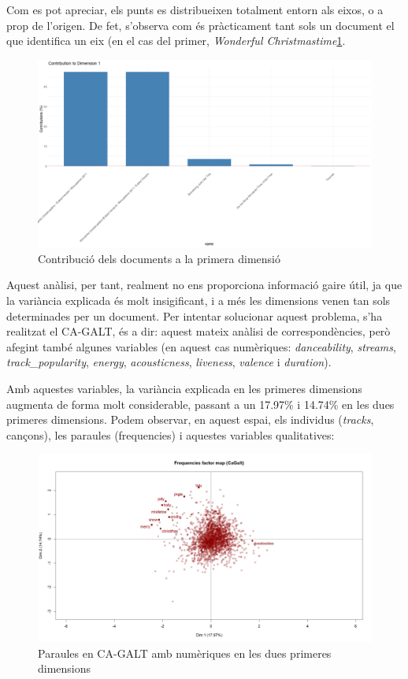 Com es pot apreciar, els punts es distribueixen totalment entorn als eixos, o a prop de l'origen. De fet, s'observa com és pràcticament tant sols un document el que identifica un eix (en el cas del primer, \textit{Wonderful Christmastime}\ref{fig:textual_ca_contrib_docs_1}.

\begin{figure}[H]
    \centering
    \includegraphics[width=0.7\linewidth]{Images//8_Textual//Analysis/1_dimension_docs.png}
    \caption{Contribució dels documents a la primera dimensió}
    \label{fig:textual_ca_contrib_docs_1}
\end{figure}

Aquest anàlisi, per tant, realment no ens proporciona informació gaire útil, ja que la variància explicada és molt insigificant, i a més les dimensions venen tan sols determinades per un document. Per intentar solucionar aquest problema, s'ha realitzat el CA-GALT, és a dir: aquest mateix anàlisi de correspondències, però afegint també algunes variables (en aquest cas numèriques: \textit{danceability}, \textit{streams}, \textit{track\_popularity}, \textit{energy}, \textit{acousticness}, \textit{liveness}, \textit{valence} i \textit{duration}).

Amb aquestes variables, la variància explicada en les primeres dimensions augmenta de forma molt considerable, passant a un 17.97\% i 14.74\% en les dues primeres dimensions. Podem observar, en aquest espai, els individus (\textit{tracks}, cançons), les paraules (frequencies) i aquestes variables qualitatives:

\begin{figure}[H]
    \centering
    \includegraphics[width=0.7\linewidth]{Images//8_Textual//Analysis/cagalt_words_12.png}
    \caption{Paraules en CA-GALT amb numèriques en les dues primeres dimensions}
    \label{fig:textual_cagaltnum_words12}
\end{figure}

